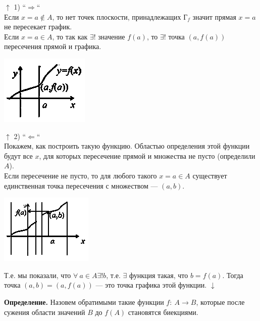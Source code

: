 \documentclass{article}
\begin{document}
    \noindent\begin{minipage}{0.775\textwidth}\raggedright
        $\uparrow$ 1) ``$\Rightarrow$``\\
        Если $x = a \not\in A$, то нет точек плоскости, принадлежащих $\textrm{Г}_f$ значит прямая $x = a$ не пересекает график.\\
        Если $x = a \in A$, то так как $\exists!$ значение $f(a)$, то $\exists!$ точка $(a, f(a))$ пересечения прямой и графика.    
    \end{minipage}
    \hfill%
    \begin{minipage}{0.2\textwidth}\raggedleft
        \includegraphics[scale=0.75]{4_1}
    \end{minipage}

    \noindent\begin{minipage}{0.775\textwidth}\raggedright
        $\uparrow$ 2) ``$\Leftarrow$``\\
        Покажем, как построить такую функцию. Областью определения этой функции будут все $x$, для которых пересечение прямой и множества не пусто (определили $A$).\\
        Если пересечение не пусто, то для любого такого $x = a \in A$ существует единственная точка пересечения с множеством --- $(a, b)$.
    \end{minipage}
    \hfill%
    \begin{minipage}{0.2\textwidth}\raggedleft
        \includegraphics[scale=0.75]{4_2}
    \end{minipage}

    Т.е. мы показали, что $\forall\ a \in A \exists! b$, т.е. $\exists$ функция такая, что $b = f(a)$. Тогда точка $(a, b) = (a, f(a))$ --- это точка графика этой функции. $\downarrow$
    
    \textbf{Определение.} Назовем обратимыми такие функции $f:\ A \rightarrow B$, которые после сужения области значений $B$ до $f(A)$ становятся биекциями.
\end{document}
